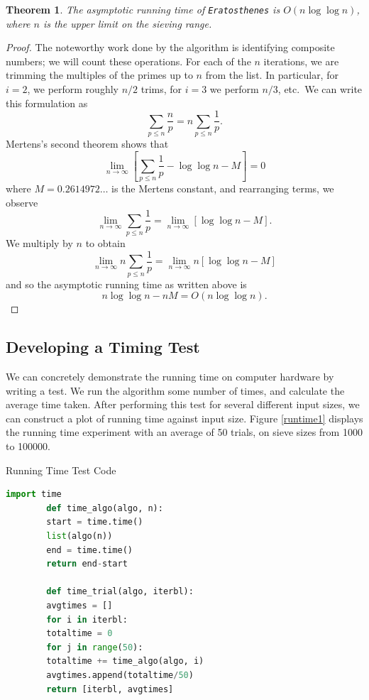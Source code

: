 \documentclass{amsart}
\newtheorem{thm}{Theorem}
\theoremstyle{definition}
\theoremstyle{case}
\begin{document}
	\begin{thm}\label{runtimethm}
		The asymptotic running time of \texttt{Eratosthenes} is $O(n\log\log n)$, where $n$ is the upper limit on the sieving range.
	\end{thm}
	\begin{proof}
		The noteworthy work done by the algorithm is identifying composite numbers; we will count these operations. For each of the $n$ iterations, we are trimming the multiples of the primes up to $n$ from the list. In particular, for $i=2$, we perform roughly $n/2$ trims, for $i=3$ we perform $n/3$, etc.\ We can write this formulation as
		$$ \sum_{p\leq n} \frac{n}{p} = n \sum_{p \leq n} \frac{1}{p} . $$
		Mertens's second theorem shows that
		$$ \lim\limits_{n\rightarrow\infty} \left[ \sum_{p \leq n} \frac{1}{p} - \log\log n - M \right] = 0 $$
		where $M=0.2614972\dots$ is the Mertens constant, and rearranging terms, we observe
		$$ \lim\limits_{n\rightarrow\infty} \sum_{p \leq n} \frac{1}{p} = \lim\limits_{n\rightarrow\infty} \left[ \log\log n - M \right] . $$
		We multiply by $n$ to obtain
		$$ \lim\limits_{n\rightarrow\infty} n \sum_{p \leq n} \frac{1}{p} = \lim\limits_{n\rightarrow\infty} n \left[ \log\log n - M \right] $$
		and so the asymptotic running time as written above is
		$$ n \log \log n - nM = O(n\log\log n). $$
	\end{proof}
	
	\subsection{Developing a Timing Test}
	
	We can concretely demonstrate the running time on computer hardware by writing a test. We run the algorithm some number of times, and calculate the average time taken. After performing this test for several different input sizes, we can construct a plot of running time against input size. Figure \ref{runtime1} displays the running time experiment with an average of 50 trials, on sieve sizes from 1000 to 100000.
	
	\begin{Algorithm}[H]\caption{Running Time Test Code}
		\begin{lstlisting}[language=Python]
		import time
		def time_algo(algo, n):
		start = time.time()
		list(algo(n))
		end = time.time()
		return end-start
		
		def time_trial(algo, iterbl):
		avgtimes = []
		for i in iterbl:
		totaltime = 0
		for j in range(50):
		totaltime += time_algo(algo, i)
		avgtimes.append(totaltime/50)
		return [iterbl, avgtimes]
		\end{lstlisting}
	\end{Algorithm}
	
\end{document}
